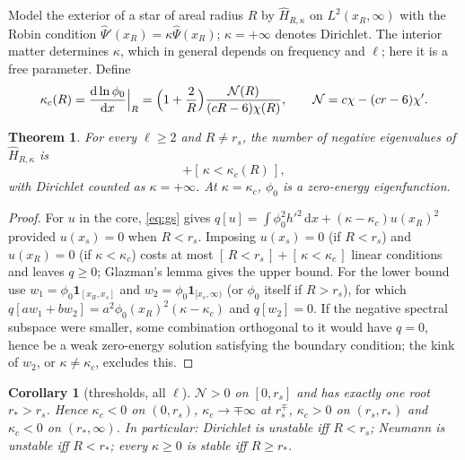 \documentclass[11pt]{article}
\newtheorem{theorem}{Theorem}
\newtheorem{corollary}{Corollary}
\theoremstyle{remark}
\newcommand{\Hhat}{\hat{H}}
\newcommand{\dd}{\mathrm{d}}
\newcommand{\Ind}[1]{[\,#1\,]}
\begin{document}
Model the exterior of a star of areal radius $R$ by $\Hhat_{R,\kappa}$ on $L^2(x_R,\infty)$ with the Robin condition
$\hat\Psi'(x_R)=\kappa\hat\Psi(x_R)$; $\kappa=+\infty$ denotes Dirichlet. The interior matter determines $\kappa$, which in
general depends on frequency and $\ell$; here it is a free parameter. Define
\begin{equation}\label{eq:kc}
\kappa_c(R)=\frac{\dd\ln\phi_0}{\dd x}\Big|_R=\Bigl(1+\frac2R\Bigr)\frac{\mathcal N(R)}{(cR-6)\chi(R)},
\qquad \mathcal N=c\chi-(cr-6)\chi'.
\end{equation}

\begin{theorem}\label{thm:trunc}
For every $\ell\ge2$ and $R\neq r_s$, the number of negative eigenvalues of $\Hhat_{R,\kappa}$ is
\begin{equation}
\Ind{R<r_s}+\Ind{\kappa<\kappa_c(R)},
\end{equation}
with Dirichlet counted as $\kappa=+\infty$. At $\kappa=\kappa_c$, $\phi_0$ is a zero-energy eigenfunction.
\end{theorem}

\begin{proof}
For $u$ in the core, \eqref{eq:gs} gives $q[u]=\int\phi_0^2h'^2\,\dd x+(\kappa-\kappa_c)u(x_R)^2$ provided $u(x_s)=0$ when
$R<r_s$. Imposing $u(x_s)=0$ (if $R<r_s$) and $u(x_R)=0$ (if $\kappa<\kappa_c$) costs at most
$\Ind{R<r_s}+\Ind{\kappa<\kappa_c}$ linear conditions and leaves $q\ge0$; Glazman's lemma gives the upper bound. For the
lower bound use $w_1=\phi_0\mathbf 1_{[x_R,x_s]}$ and $w_2=\phi_0\mathbf 1_{[x_s,\infty)}$ (or $\phi_0$ itself if
$R>r_s$), for which $q[aw_1+bw_2]=a^2\phi_0(x_R)^2(\kappa-\kappa_c)$ and $q[w_2]=0$. If the negative spectral subspace
were smaller, some combination orthogonal to it would have $q=0$, hence be a weak zero-energy solution satisfying the
boundary condition; the kink of $w_2$, or $\kappa\ne\kappa_c$, excludes this.
\end{proof}

\begin{corollary}[thresholds, all $\ell$]\label{cor:thr}
$\mathcal N>0$ on $[0,r_s]$ and has exactly one root $r_*>r_s$. Hence $\kappa_c<0$ on $(0,r_s)$, $\kappa_c\to\mp\infty$
at $r_s^\mp$, $\kappa_c>0$ on $(r_s,r_*)$ and $\kappa_c<0$ on $(r_*,\infty)$. In particular:
Dirichlet is unstable iff $R<r_s$; Neumann is unstable iff $R<r_*$; every $\kappa\ge0$ is stable iff $R\ge r_*$.
\end{corollary}
\end{document}
